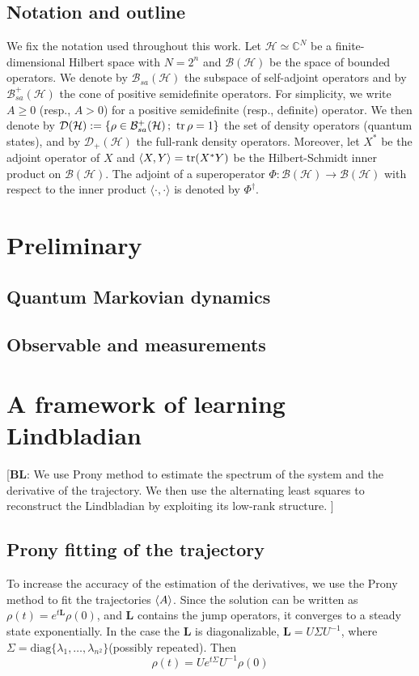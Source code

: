\documentclass[10pt]{article}  %
\theoremstyle{plain}
\numberwithin{equation}{section}
\def\C{\mathbb{C}}
\newcommand{\bL}{\mathbf{L}}
\newcommand{\bh}{\mathbf{h}}
\newcommand{\diag}{\text{diag}}
\newcommand{\bl}[1]{{\color{magenta} [\textbf{BL}: #1]}}
\newcommand{\mc}[1]{\mathcal{#1}}
\renewcommand{\C}{\mathbb{C}}
\def \bh {\mc{B}(\mc{H})}
\def \l {\langle}
\def \r {\rangle}
\def \dd {\cdot}
\begin{document}
\subsection*{Notation and outline}
We fix the notation used throughout this work. Let $\mc{H}\simeq \C^N$ be a finite-dimensional Hilbert space with $N = 2^n$ and $\mc{B}(\mc{H})$ be the space of bounded operators. We denote by $\mc{B}_{sa}(\mc{H})$ the subspace of self-adjoint operators and by $\mc{B}^{+}_{sa}(\mc{H})$ the cone of positive semidefinite operators. For simplicity, we write $A \ge 0$ (resp., $A > 0$) for a positive semidefinite (resp., definite) operator. We then denote by $\mc{D}(\mc{H}) := \{\rho \in \mc{B}_{sa}^+(\mc{H})\,;\  \tr \rho =1 \}$ the set of density operators (quantum states), and by $\mc{D}_+(\mc{H})$ the full-rank density operators. Moreover, let $X^*$ be the adjoint operator of $X$ and $\l X, Y\r = \tr (X^*Y)$ be the Hilbert-Schmidt inner product on $\bh$. 
The adjoint of a superoperator $\Phi: \mc{B}(\mc{H}) \to \mc{B}(\mc{H})$ with respect to the inner product $\l \dd,\dd \r $ is denoted by $\Phi^\dag$. 


\section{Preliminary}

\subsection{Quantum Markovian dynamics}

\subsection{Observable and measurements}

\section{A framework of learning Lindbladian}
\bl{We use Prony method to estimate the spectrum of the system and the derivative of the trajectory. We then use the alternating least squares to reconstruct the Lindbladian by exploiting its low-rank structure.
}

\subsection{Prony fitting of the trajectory}
To increase the accuracy of the estimation of the derivatives, we use the Prony method to fit the trajectories $\expval{A}$. Since the solution can be written as $\rho(t) = e^{t\bL } \rho(0)$, and $\bL$ contains the jump operators, it converges to a steady state exponentially. In the case the $\bL$ is diagonalizable, $\bL = U \Sigma U^{-1}$, where $\Sigma = \diag\{\lambda_1, \dots, \lambda_{n^2}\}$(possibly repeated). Then 
\begin{equation}
	\rho(t) = Ue^{t\Sigma}U^{-1}\rho(0)
\end{equation}
\end{document}

